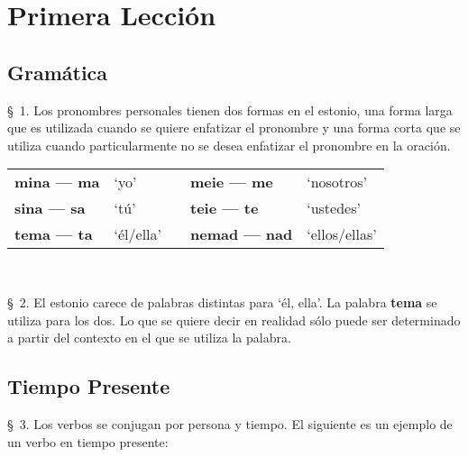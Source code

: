 %
%

\chapter{Primera Lección}

\label{ch:lesson01} %


\Large{\section{Gramática}}

\S\ 1. Los pronombres personales tienen dos formas en el estonio, una forma larga que es utilizada cuando se quiere enfatizar el pronombre y una forma corta que se utiliza cuando particularmente no se desea enfatizar el pronombre en la oración.\\

\begin{tabular}{ l l c l l }
	\textbf{mina — ma} & `yo'		& &	\textbf{meie — me} 	& `nosotros' \\
	\textbf{sina — sa} & `tú'		& &	\textbf{teie — te}	& `ustedes' \\
	\textbf{tema — ta} & `él/ella'	& &	\textbf{nemad — nad}&`ellos/ellas'
\end{tabular}\\ \bigskip

\S\ 2. El estonio carece de palabras distintas para `él, ella'. La palabra \textbf{tema} se utiliza para los dos. Lo que se quiere decir en realidad sólo puede ser determinado a partir del contexto en el que se utiliza la palabra.\\

\Large{\section{Tiempo Presente}}

\S\ 3. Los verbos se conjugan por persona y tiempo. El siguiente es un ejemplo de un verbo en tiempo presente:\\

